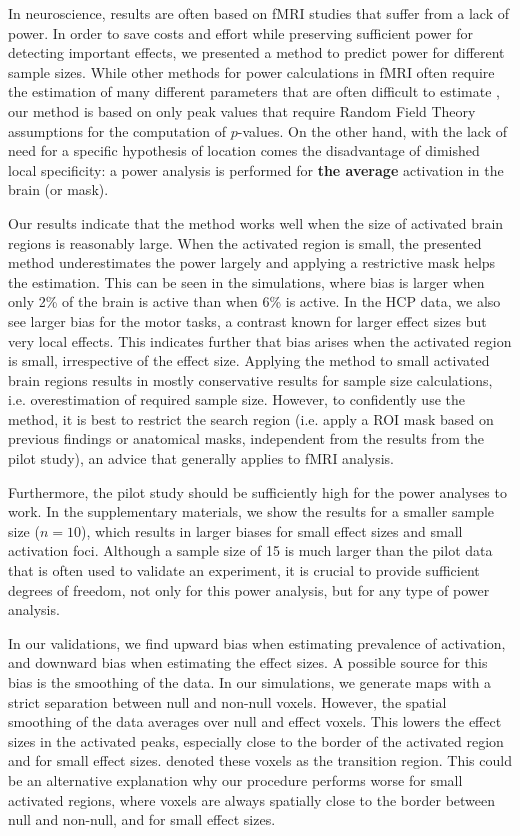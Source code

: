 In neuroscience, results are often based on fMRI studies that suffer from a lack of power.  In order to save costs and effort while preserving sufficient power for detecting important effects, we presented a method to predict power for different sample sizes.  While other methods for power calculations in fMRI often require the estimation of many different parameters that are often difficult to estimate \citep{Mumford2008,Desmond2002}, our method is based on only peak values that require Random Field Theory assumptions for the computation of $p$-values.  {\color{Cyan} On the other hand, with the lack of need for a specific hypothesis of location comes the disadvantage of dimished local specificity: a power analysis is performed for \textbf{the average} activation in the brain (or mask).}

Our results indicate that the method works well when the size of activated brain regions is reasonably large.  When the activated region is small, the presented method underestimates the power largely and applying a restrictive mask helps the estimation.  This can be seen in the simulations, where bias is larger when only 2\% of the brain is active than when 6\% is active.  In the HCP data, we also see larger bias for the motor tasks, a contrast known for larger effect sizes but very local effects.  This indicates further that bias arises when the activated region is small, irrespective of the effect size.  Applying the method to small activated brain regions results in mostly conservative results for sample size calculations, i.e. overestimation of required sample size.  However, to confidently use the method, it is best to restrict the search region (i.e. apply a ROI mask {\color{Cyan}based on previous findings or anatomical masks, independent from the results from the pilot study}), an advice that generally applies to fMRI analysis.

Furthermore, the pilot study should be sufficiently high for the power analyses to work.  In the supplementary materials, we show the results for a smaller sample size ($n=10$), which results in larger biases for small effect sizes and small activation foci.  {\color{Cyan}Although a sample size of 15 is much larger than the pilot data that is often used to validate an experiment, it is crucial to provide sufficient degrees of freedom, not only for this power analysis, but for any type of power analysis.}

In our validations, we find upward bias when estimating prevalence of activation, and downward bias when estimating the effect sizes.  A possible source for this bias is the smoothing of the data.  In our simulations, we generate maps with a strict separation between null and non-null voxels.  However, the spatial smoothing of the data averages over null and effect voxels.  This lowers the effect sizes in the activated peaks, especially close to the border of the activated region and for small effect sizes.  \citet{Cheng2015} denoted these voxels as the transition region.  This could be an alternative explanation why our procedure performs worse for small activated regions, where voxels are always spatially close to the border between null and non-null, and for small effect sizes.

